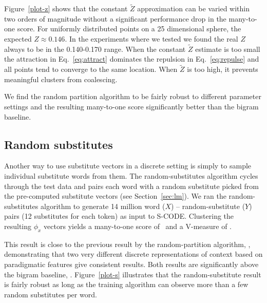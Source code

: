 Figure~\ref{plot-z} shows that the constant $\tilde{Z}$ approximation
can be varied within two orders of magnitude without a significant
performance drop in the many-to-one score.  For uniformly distributed
points on a 25 dimensional sphere, the expected $Z\approx 0.146$.  In
the experiments where we tested we found the real $Z$ always to be in
the 0.140-0.170 range.  When the constant $\tilde{Z}$ estimate is too
small the attraction in Eq.~\ref{eq:attract} dominates the repulsion
in Eq.~\ref{eq:repulse} and all points tend to converge to the same
location.  When $\tilde{Z}$ is too high, it prevents meaningful
clusters from coalescing.

We find the random partition algorithm to be fairly robust to different
parameter settings and the resulting many-to-one score significantly
better than the bigram baseline.

\subsection{Random substitutes}\label{sec:wordsub}

Another way to use substitute vectors in a discrete setting is simply
to sample individual substitute words from them.  The
random-substitutes algorithm cycles through the test data and pairs
each word with a random substitute picked from the pre-computed
substitute vectors (see Section~\ref{sec:lm}).  We ran the
random-substitutes algorithm to generate 14 million word ($X$) --
random-substitute ($Y$) pairs (12 substitutes for each token) as input
to S-CODE.  Clustering the resulting $\phi_x$ vectors yields a
many-to-one score of \wsmto\ and a V-measure of \wsvm.

This result is close to the previous result by the random-partition
algorithm, \rpmto, demonstrating that two very different discrete
representations of context based on paradigmatic features give
consistent results.  Both results are significantly above the bigram
baseline, \bgmto.  Figure~\ref{plot-s} illustrates that the
random-substitute result is fairly robust as long as the training
algorithm can observe more than a few random substitutes per word.


